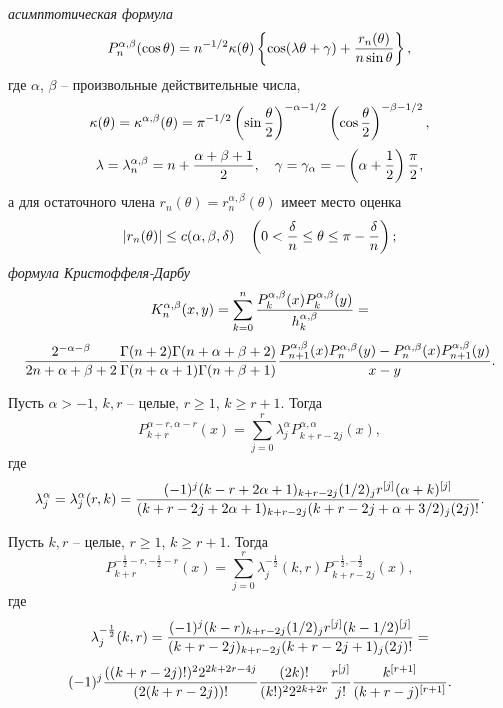 \textit{асимптотическая формула}
\begin{equation}\label{sob-jac-discrete-eq2.12}
P_n^{\alpha,\beta}(\cos\theta)=n^{-1/2}
\kappa(\theta)\left\{\cos(\lambda\theta+\gamma)+ {r_n(\theta)\over
n\sin\theta}\right\},
\end{equation}
где $\alpha$, $\beta$ -- произвольные действительные числа,
$$
\kappa(\theta) =\kappa^{\alpha,\beta}(\theta)=
\pi^{-1/2}\left(\sin{\theta\over2}\right)^{-\alpha-1/2}
\left(\cos{\theta\over2}\right)^{-\beta-1/2},
$$
$$
\lambda =\lambda^{\alpha,\beta}_n=
n+{\alpha+\beta+1\over2},\quad\gamma = \gamma_\alpha= -\left(
\alpha+{1\over2}\right){\pi\over2},
$$
а для остаточного члена $r_n(\theta)=r_n^{\alpha,\beta}(\theta)$
имеет место оценка
$$
|r_n(\theta)|\le c(\alpha,\beta,\delta)\quad \left(0< {\delta\over
n}\le\theta\le\pi-{\delta\over n}\right);
$$
\textit{формула Кристоффеля-Дарбу }
$$
 K_n^{\alpha,\beta}(x,y)=
\sum_{k=0}^n{P_k^{\alpha,\beta}(x)P_k^{\alpha,\beta}(y)\over
h_k^{\alpha,\beta}}=
 $$
\begin{equation}\label{sob-jac-discrete-eq2.13}
 {2^{-\alpha-\beta}\over
2n+\alpha+\beta+2} {\Gamma(n+2)\Gamma(n+\alpha+\beta+2)\over
\Gamma(n+\alpha+1)\Gamma(n+\beta+1)}
 {P_{n+1}^{\alpha,\beta}(x)P_n^{\alpha,\beta}(y)-
P_n^{\alpha,\beta}(x)P_{n+1}^{\alpha,\beta}(y)\over x-y}.
\end{equation}




\begin{lemma} Пусть $\alpha>-1$, $k,r$ -- целые, $r\ge1$,
     $k\ge r+1$. Тогда
     $$
P_{k+r}^{\alpha-r,\alpha-r}(x)=\sum_{j=0}^r\lambda_j^\alpha
P_{k+r-2j}^{\alpha,\alpha}(x),
     $$
где
     $$
 \lambda_j^\alpha=\lambda_j^\alpha(r,k)=
{(-1)^j(k-r+2\alpha+1)_{k+r-2j}(1/2)_jr^{[j]}
     (\alpha+k)^{[j]}
\over(k+r-2j+2\alpha+1)_{k+r-2j} (k+r-2j+\alpha+3/2)_j(2j)!}.
     $$
\end{lemma}

\begin{lemma} Пусть  $k,r$ -- целые, $r\ge1$,
     $k\ge r+1$. Тогда
     $$
P_{k+r}^{-\frac12-r,-\frac12-r}(x)=\sum_{j=0}^r\lambda_j^{-\frac12}(k,r)
P_{k+r-2j}^{-\frac12,-\frac12}(x),
     $$
где
$$
 \lambda_j^{-\frac12}(k,r)=
{(-1)^j(k-r)_{k+r-2j}(1/2)_jr^{[j]}
     (k-1/2)^{[j]}
\over(k+r-2j)_{k+r-2j} (k+r-2j+1)_j(2j)!}=
$$
\begin{equation}\label{Haar-Tcheb-eq5.11}
(-1)^j{((k+r-2j)!)^22^{2k+2r-4j}\over(2(k+r-2j))!}
{(2k)!\over(k!)^22^{2k+2r}}{r^{[j]}\over j!}
{k^{[r+1]}\over(k+r-j)^{[r+1]}}.
\end{equation}
\end{lemma}


